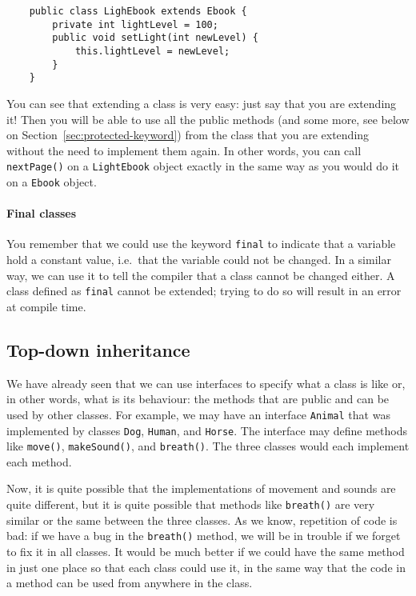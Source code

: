 \begin{verbatim}
    public class LighEbook extends Ebook {
        private int lightLevel = 100;
        public void setLight(int newLevel) {
            this.lightLevel = newLevel;
        }
    }
\end{verbatim}

You can see that extending a class is very easy: just say that you are
extending it! Then you will be able to use all the public methods (and
some more, see below on Section~\ref{sec:protected-keyword}) from
the class that you are extending without the need to implement them
again. In other words, you can call \verb+nextPage()+ on a
\verb+LightEbook+ object exactly in the same way as you would do it
on a \verb+Ebook+ object. 


\paragraph{Final classes}
\label{sec:final-classes}

You remember that we could use the keyword \verb+final+ to indicate
that a variable hold a constant value, i.e.~that the variable could
not be changed. In a similar way, we can use it to tell the compiler
that a class cannot be changed either. A class defined as \verb+final+
cannot be extended; trying to do so will result in an error at compile
time. 


\subsection{Top-down inheritance}
\label{sec:top-down-inheritance}

We have already seen that we can use interfaces to specify what a
class is like or, in other words, what is its behaviour: the methods
that are public and can be used by other classes. For example, we may
have an interface \verb+Animal+ that was implemented by classes
\verb+Dog+, \verb+Human+, and \verb+Horse+. The interface may define
methods like \verb+move()+, \verb+makeSound()+, and
\verb+breath()+. The three classes would each implement each method. 

Now, it is quite possible that the implementations of movement and
sounds are quite different, but it is quite possible that methods like
\verb+breath()+ are very similar or the same between the three
classes. As we know, repetition of code is bad: if we have a bug
in the \verb+breath()+ method, we will be in trouble if we forget to
fix it in all classes. It would be much better if we could have the
same method in just one place so that each class could use it, in the
same way that the code in a method can be used from anywhere in the
class. 

